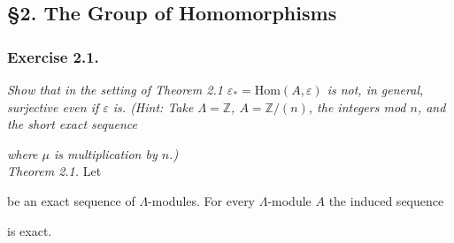 \documentclass{article}
\begin{document}



\subsection*{\S 2. The Group of Homomorphisms \\}



\subsubsection*{Exercise 2.1.}
\emph{Show that in the setting of Theorem 2.1
$\varepsilon_{*} = \mathrm{Hom}(A,\varepsilon)$ is not, in general, surjective
even if $\varepsilon$ is.
(Hint: Take $\Lambda = \mathbb{Z}$, $A = \mathbb{Z}/(n)$, the integers mod $n$,
and the short exact sequence}
\emph{where $\mu$ is multiplication by $n$.)} \\



\emph{Theorem 2.1.}
Let
be an exact sequence of $\Lambda$-modules.
For every $\Lambda$-module $A$ the induced sequence
\begin{center}
\end{center}
is exact. \\
\end{document}
